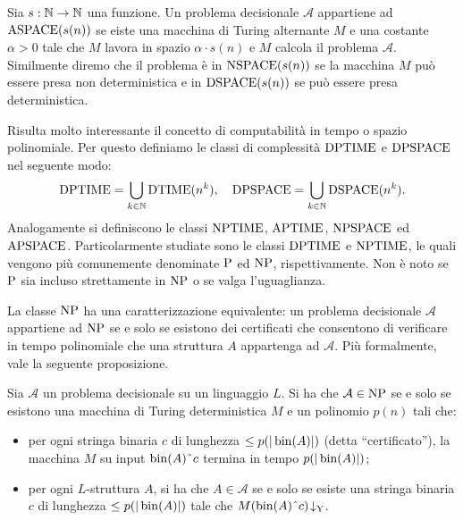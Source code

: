 \begin{definizione}
 Sia $s:\N\to\N$ una funzione.
 Un problema decisionale $\mathcal{A}$ appartiene ad $\ASPACE(s(n))$ se eiste una macchina
 di Turing alternante $M$ e una costante $\alpha>0$ tale che $M$ lavora in spazio
 $\alpha \cdot s(n)$ e $M$ calcola il problema $\mathcal{A}$. Similmente diremo che
 il problema è in $\NSPACE(s(n))$ se la macchina $M$ può essere presa non
 deterministica e in $\DSPACE(s(n))$ se può essere presa deterministica.
\end{definizione}

Risulta molto interessante il concetto di computabilità in tempo o spazio polinomiale.
Per questo definiamo le classi di complessità $\DPTIME$ e $\DPSPACE$ nel seguente modo:
\[ \DPTIME = \bigcup_{k\in\N} \DTIME(n^k), \quad \DPSPACE = \bigcup_{k\in\N} \DSPACE(n^k). \]
Analogamente si definiscono le classi $\NPTIME$, $\APTIME$, $\NPSPACE$ ed $\APSPACE$.
Particolarmente studiate sono le classi $\DPTIME$ e $\NPTIME$, le quali vengono più comunemente denominate $\P$ ed $\NP$, rispettivamente.
Non è noto se $\P$ sia incluso strettamente in $\NP$ o se valga l'uguaglianza.

La classe $\NP$ ha una caratterizzazione equivalente: un problema decisionale $\mathcal{A}$ appartiene ad $\NP$ se e solo se esistono dei certificati che consentono di verificare in tempo polinomiale che una struttura $A$ appartenga ad $\mathcal{A}$.
Più formalmente, vale la seguente proposizione.

\begin{proposizione}
  \label{prop:caratterizzazione-np}
  Sia $\mathcal{A}$ un problema decisionale su un linguaggio $L$.
  Si ha che $\mathcal{A} \in \NP$ se e solo se esistono una macchina di Turing deterministica $M$ e un polinomio $p(n)$ tali che:
  \begin{itemize}
    \item per ogni stringa binaria $c$ di lunghezza $\leq p(|\bin(A)|)$ (detta ``certificato''), la macchina $M$ su input $\bin(A)\string^ c$ termina in tempo $p(|\bin(A)|)$;
    \item per ogni $L$-struttura $A$, si ha che $A\in \mathcal{A}$ se e solo se esiste una stringa binaria $c$ di lunghezza $\leq p(|\bin(A)|)$ tale che $M(\bin(A)\string^ c)\accepts$.
  \end{itemize}
\end{proposizione}

